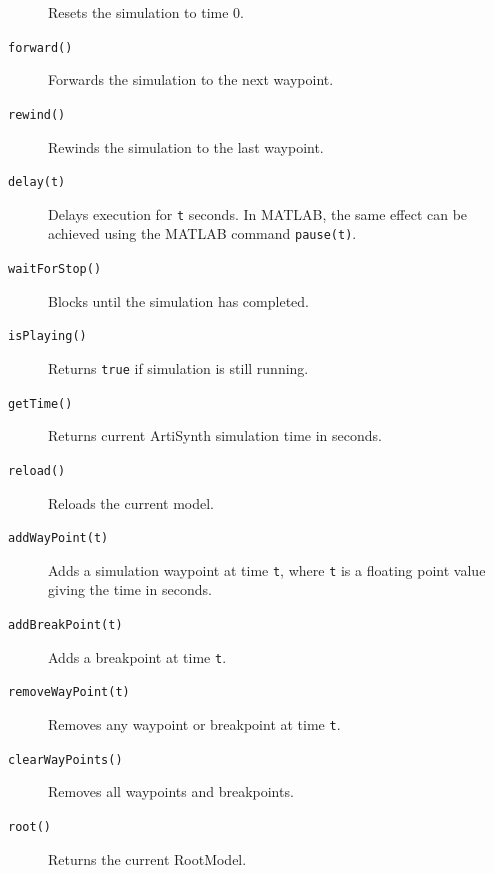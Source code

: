 \documentclass{article}
\begin{document}
\begin{description}
Resets the simulation to time 0.

\item[{\tt forward()} ] \mbox{}

Forwards the simulation to the next waypoint.

\item[{\tt rewind()} ] \mbox{}

Rewinds the simulation to the last waypoint.

\item[{\tt delay(t)} ] \mbox{}

Delays execution for {\tt t} seconds. In MATLAB, the same effect can
be achieved using the MATLAB command {\tt pause(t)}.

\item[{\tt waitForStop()} ] \mbox{}

Blocks until the simulation has completed.

\item[{\tt isPlaying()} ] \mbox{}

Returns {\tt true} if simulation is still running.

\item[{\tt getTime()} ] \mbox{}

Returns current ArtiSynth simulation time in seconds.

\item[{\tt reload()} ] \mbox{}

Reloads the current model.

\item[{\tt addWayPoint(t)} ] \mbox{}

Adds a simulation waypoint at time {\tt t},
where {\tt t} is a floating point value giving
the time in seconds.

\item[{\tt addBreakPoint(t)} ] \mbox{}

Adds a breakpoint at time {\tt t}.

\item[{\tt removeWayPoint(t)} ] \mbox{}

Removes any waypoint or breakpoint at time {\tt t}.

\item[{\tt clearWayPoints()} ] \mbox{}

Removes all waypoints and breakpoints.

\item[{\tt root()} ] \mbox{}

Returns the current RootModel.


\end{description}
\end{document}
